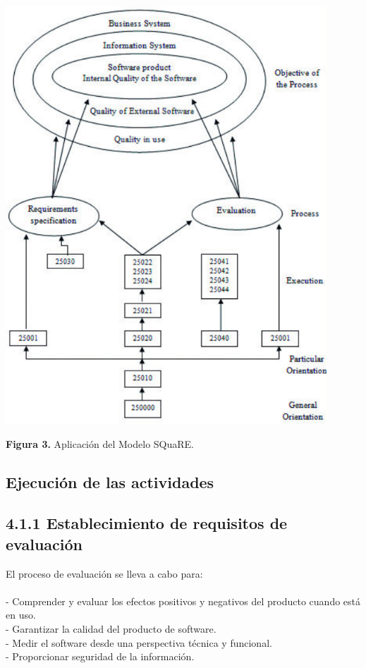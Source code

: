\documentclass[https://www.overleaf.com/project/63761df255a8a9f4a15c3579
	letterpaper, %
	10pt, %
]{CSUniSchoolLabReport}
\begin{document}
        \begin{center}
            \includegraphics[width=1\linewidth]{image3.png}
        \end{center}
        \begin{center}
            \textbf{Figura 3.}\hspace{0.5em} Aplicación del Modelo SQuaRE.
        \end{center}

        \subsection{Ejecución de las actividades}
            \subsection*{4.1.1 \hspace{0.5em} Establecimiento de requisitos de evaluación}
                El proceso de evaluación se lleva a cabo para:
                \\\\
                - Comprender y evaluar los efectos positivos y negativos del producto cuando está en uso.
                \\
                - Garantizar la calidad del producto de software.
                \\
                - Medir el software desde una perspectiva técnica y funcional.
                \\
                - Proporcionar seguridad de la información.
            
\end{document}
